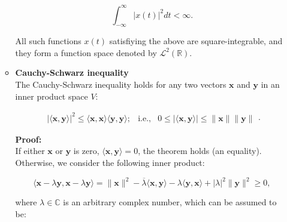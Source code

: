 \documentclass[10pt,b5paper,titlepage]{book}
\begin{document}
\begin{itemize}
\begin{itemize}
                 \begin{equation}
                     \int_{-\infty}^{\infty} |x(t)|^{2} dt < \infty  
                 .\end{equation}

                 All such functions $x(t)$ satisfiying the above are square-integrable,
                 and they form a function space denoted by $\mathcal{L}^{2}(\mathbb{R})$.

             \item \textbf{Cauchy-Schwarz inequality}\\

                 The Cauchy-Schwarz inequality holds for any two vectors $\mathbf{x}$
                 and $\mathbf{y}$ in an inner product space $V$:

                 \begin{equation}
                     \begin{array}{lcr}
                         | \langle \mathbf{x}, \mathbf{y} \rangle |^{2}
                         \le \langle \mathbf{x}, \mathbf{x} \rangle
                         \langle \mathbf{y}, \mathbf{y} \rangle; &
                         \text{i.e.,} &
                         0 \le  | \langle \mathbf{x}, \mathbf{y} \rangle |
                         \le \|\mathbf{x}\| \|\mathbf{y}\|
                     \end{array}
                 .\end{equation}

                 \textbf{Proof:}\\

                 If either $\mathbf{x}$ or $\mathbf{y}$ is zero,
                 $\langle \mathbf{x}, \mathbf{y} \rangle = 0$, the theorem holds
                 (an equality). Otherwise, we consider the following inner product:

                 \begin{equation}
                     \langle \mathbf{x} - \lambda \mathbf{y}, \mathbf{x} - \lambda \mathbf{y} \rangle
                     = \|\mathbf{x}\|^{2}
                     - \overline{\lambda} \langle \mathbf{x}, \mathbf{y} \rangle
                     - \lambda \langle \mathbf{y}, \mathbf{x} \rangle
                     + |\lambda|^{2} \|\mathbf{y}\|^{2}
                     \ge 0
                 ,\end{equation}

                 where $\lambda \in \mathbb{C}$ is an arbitrary complex number, which
                 can be assumed to be:


\end{itemize}
\end{itemize}
\end{document}
